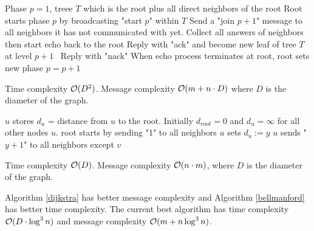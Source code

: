 \documentclass[11pt, oneside]{book}   						%
\begin{document}
\begin{algorithm}
\caption{}\label{dijkstra}
\begin{algorithmic}[1]
\State Phase $p=1$, treee $T$ which is the root plus all direct neighbors of the root
\Repeat
	\State Root starts phase $p$ by broadcasting "start $p$" within $T$
		\State Send a "join $p+1$" message to all neighbors it has not communicated with yet.
		\State Collect all answers of neighbors then start echo back to the root
	\EndForEach
			\State Reply with "ack" and become new leaf of tree $T$ at level $p+1$
		\Else
			\State Reply with "nack"
		\EndIf
	\EndForEach
	\State When echo process terminates at root, root sets new phase $p=p+1$
\end{algorithmic}
\end{algorithm}
\begin{mythm} Time complexity $\mathcal{O}(D^2)$. Message complexity $\mathcal{O}(m+n\cdot D)$ where $D$ is the diameter of the graph.\end{mythm}

\begin{algorithm}
\caption{}\label{bellmanford}
\begin{algorithmic}[1]
\State $u$ stores $d_u$ = distance from $u$ to the root. Initially $d_{root}=0$ and $d_u=\infty $ for all other nodes $u$.
\State root starts by sending "1" to all neighbors
	\State $u$ sets $d_u := y$
	\State $u$ sends "$y+1$" to all neighbors except $v$
\EndIf
\end{algorithmic}
\end{algorithm}
\begin{mythm} Time complexity $\mathcal{O}(D)$. Message complexity $\mathcal{O}(n\cdot m)$, where $D$ is the diameter of the graph.\end{mythm}
\begin{myremark}Algorithm \ref{dijkstra} has better message complexity and Algorithm \ref{bellmanford} has better time complexity. The current best algorithm has time complexity $\mathcal{O}(D\cdot \log^3n)$ and message complexity $\mathcal{O}(m+n \log^3n)$.
\end{myremark}
\end{document}
